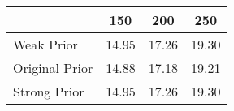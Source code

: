 \begin{tabular}{lccc}
\toprule
 & 150 & 200 & 250 \\
\midrule
Weak Prior & 14.95 & 17.26 & 19.30 \\
Original Prior & 14.88 & 17.18 & 19.21 \\
Strong Prior & 14.95 & 17.26 & 19.30 \\
\bottomrule
\end{tabular}
